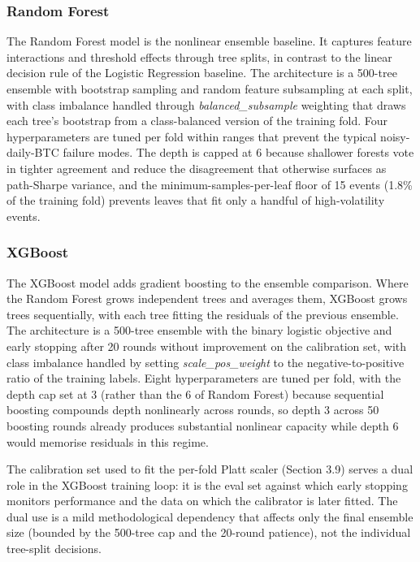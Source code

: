 \documentclass[12pt,a4paper,oneside]{article}
\begin{document}
\subsubsection{Random Forest}\label{subsubsec:rf}

The Random Forest model \citep{breiman_2001} is the nonlinear ensemble baseline. It captures feature interactions and threshold effects through tree splits, in contrast to the linear decision rule of the Logistic Regression baseline. The architecture is a 500-tree ensemble with bootstrap sampling and random feature subsampling at each split, with class imbalance handled through \textit{balanced\_subsample} weighting that draws each tree's bootstrap from a class-balanced version of the training fold. Four hyperparameters are tuned per fold within ranges that prevent the typical noisy-daily-BTC failure modes. The depth is capped at 6 because shallower forests vote in tighter agreement and reduce the disagreement that otherwise surfaces as path-Sharpe variance, and the minimum-samples-per-leaf floor of 15 events (1.8\% of the training fold) prevents leaves that fit only a handful of high-volatility events.


\subsubsection{XGBoost}\label{subsubsec:xgb}

The XGBoost model \citep{chen_guestrin_2016} adds gradient boosting to the ensemble comparison. Where the Random Forest grows independent trees and averages them, XGBoost grows trees sequentially, with each tree fitting the residuals of the previous ensemble. The architecture is a 500-tree ensemble with the binary logistic objective and early stopping after 20 rounds without improvement on the calibration set, with class imbalance handled by setting \textit{scale\_pos\_weight} to the negative-to-positive ratio of the training labels. Eight hyperparameters are tuned per fold, with the depth cap set at 3 (rather than the 6 of Random Forest) because sequential boosting compounds depth nonlinearly across rounds, so depth 3 across 50 boosting rounds already produces substantial nonlinear capacity while depth 6 would memorise residuals in this regime.

The calibration set used to fit the per-fold Platt scaler (Section 3.9) serves a dual role in the XGBoost training loop: it is the eval set against which early stopping monitors performance and the data on which the calibrator is later fitted. The dual use is a mild methodological dependency that affects only the final ensemble size (bounded by the 500-tree cap and the 20-round patience), not the individual tree-split decisions.
\end{document}
